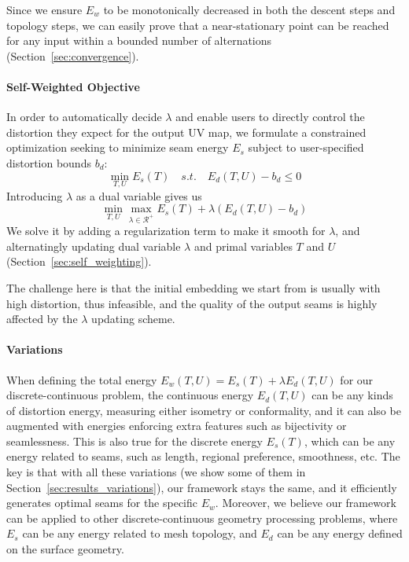 Since we ensure $E_w$ to be monotonically decreased in both the descent steps and topology steps, we can easily prove that a near-stationary point can be reached for any input within a bounded number of alternations (Section~\ref{sec:convergence}).

\paragraph{Self-Weighted Objective}

In order to automatically decide $\lambda$ and enable users to directly control the distortion they expect for the output UV map, we formulate a constrained optimization seeking to minimize seam energy $E_s$ subject to user-specified distortion bounds $b_d$:
\[ \min_{T,U} E_s(T) \quad s.t. \quad E_d(T,U) - b_d \leq 0 \]
Introducing $\lambda$ as a dual variable gives us
\[ \min_{T,U} \max_{\lambda \in \mathcal{R^+}} E_s(T) + \lambda(E_d(T,U) - b_d) \]
We solve it by adding a regularization term to make it smooth for $\lambda$, and alternatingly updating dual variable $\lambda$ and primal variables $T$ and $U$ (Section~\ref{sec:self_weighting}).

The challenge here is that the initial embedding we start from is usually with high distortion, thus infeasible, and the quality of the output seams is highly affected by the $\lambda$ updating scheme. 
 
\paragraph{Variations}

When defining the total energy $E_w(T,U) = E_s(T) + \lambda E_d(T,U)$ for our discrete-continuous problem, the continuous energy $E_d(T,U)$ can be any kinds of distortion energy, measuring either isometry or conformality, and it can also be augmented with energies enforcing extra features such as bijectivity or seamlessness. This is also true for the discrete energy $E_s(T)$, which can be any energy related to seams, such as length, regional preference, smoothness, etc. The key is that with all these variations (we show some of them in Section~\ref{sec:results_variations}), our framework stays the same, and it efficiently generates optimal seams for the specific $E_w$. Moreover, we believe our framework can be applied to other discrete-continuous geometry processing problems, where $E_s$ can be any energy related to mesh topology, and $E_d$ can be any energy defined on the surface geometry.
